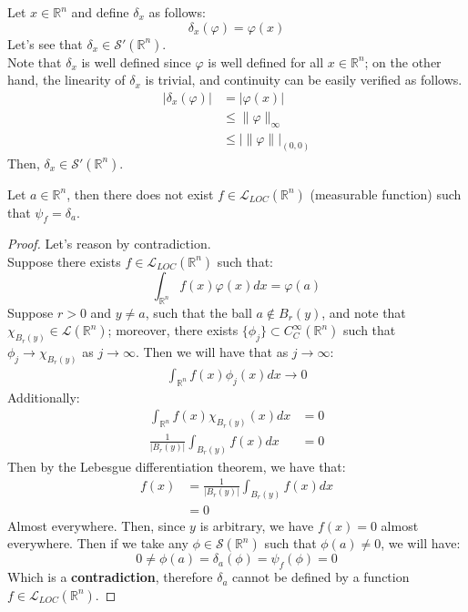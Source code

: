 \begin{example}{}
  Let $x\in\mathbb{R}^n$ and define $\delta_x$ as follows:
  $$\delta_x(\varphi)=\varphi(x)$$
  Let’s see that $\delta_x\in\mathcal{S}'(\mathbb{R}^n)$.\\
  Note that $\delta_x$ is well defined since $\varphi$ is well defined for all $x\in\mathbb{R}^n$; on the other hand, the linearity of $\delta_x$ is trivial, and continuity can be easily verified as follows.
  \begin{align*}
    |\delta_x(\varphi)|&=|\varphi(x)|\\
    &\leq\|\varphi\|_{\infty}\\
    &\leq |\|\varphi\||_{(0,0)}
  \end{align*}
  Then, $\delta_x\in\mathcal{S}'(\mathbb{R}^n)$.
\end{example}
\begin{proposition}{}
  Let $a\in\mathbb{R}^n$, then there does not exist $f\in\mathcal{L}_{LOC}(\mathbb{R}^n)$ (measurable function) such that $\psi_{f}=\delta_a$.
\end{proposition}
\begin{proof}{}
  Let’s reason by contradiction.\\
  Suppose there exists $f\in\mathcal{L}_{LOC}(\mathbb{R}^n)$ such that:
  $$\int_{\mathbb{R}^n}f(x)\varphi(x)dx=\varphi(a)$$
  Suppose $r>0$ and $y\neq a$, such that the ball $a\notin B_{r}(y)$, and note that $\chi_{B_{r}(y)}\in\mathcal{L}(\mathbb{R}^n)$; moreover, there exists $\{\phi_j\}\subset C^{\infty}_{C}(\mathbb{R}^n)$ such that $\phi_j\rightarrow \chi_{B_{r}(y)}$ as $j\rightarrow \infty$. Then we will have that as $j\rightarrow \infty$:
  \begin{align*}
    \int_{\mathbb{R}^n}f(x)\phi_{j}(x)dx \rightarrow 0
  \end{align*}
  Additionally:
  \begin{align*}
    \int_{\mathbb{R}^n}f(x)\chi_{B_{r}(y)}(x)dx&=0\\
    \frac{1}{|B_{r}(y)|}\int_{B_{r}(y)}f(x)dx&=0
  \end{align*}
  Then by the Lebesgue differentiation theorem, we have that:
  \begin{align*}
    f(x)&=\frac{1}{|B_{r}(y)|}\int_{B_{r}(y)}f(x)dx\\
    &=0
  \end{align*}
  Almost everywhere. Then, since $y$ is arbitrary, we have $f(x)=0$ almost everywhere.
  Then if we take any $\phi\in\mathcal{S}(\mathbb{R}^n)$ such that $\phi(a)\neq 0$, we will have:
  $$0\neq \phi(a)=\delta_a(\phi)=\psi_f(\phi)=0$$
  Which is a \textbf{contradiction}, therefore $\delta_a$ cannot be defined by a function $f\in\mathcal{L}_{LOC}(\mathbb{R}^n)$.
\end{proof}
